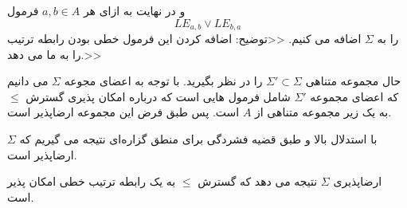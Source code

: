 \begin{ans}
    و در نهایت به ازای هر 
    $a,b \in A$
    فرمول 
    \[LE_{a,b} \lor LE_{b,a}\]
    را به 
    $\Sigma$
    اضافه می کنیم.
    <<توضیح: اضافه کردن این فرمول خطی بودن رابطه ترتیب را به ما می دهد.>>

    حال مجموعه متناهی
    $\Sigma' \subset \Sigma$
    را در نظر بگیرید. با توجه به اعضای مجوعه 
    $\Sigma$
    می دانیم که اعضای مجموعه 
    $\Sigma'$
    شامل فرمول هایی است که درباره امکان پذیری گسترش
    $\leq$
    به یک زیر مجموعه متناهی از 
    $A$
    است. پس طبق فرض این مجموعه ارضاپذیر است. 

    با استدلال بالا و طبق قضیه فشردگی برای منطق گزاره‌ای نتیجه می گیریم که 
    $\Sigma$
    ارضاپذیر است. 

    ارضاپذیری 
    $\Sigma$
    نتیجه می دهد که گسترش 
    $\leq$
    به یک رابطه ترتیب خطی 
    امکان پذیر است.


\end{ans}
